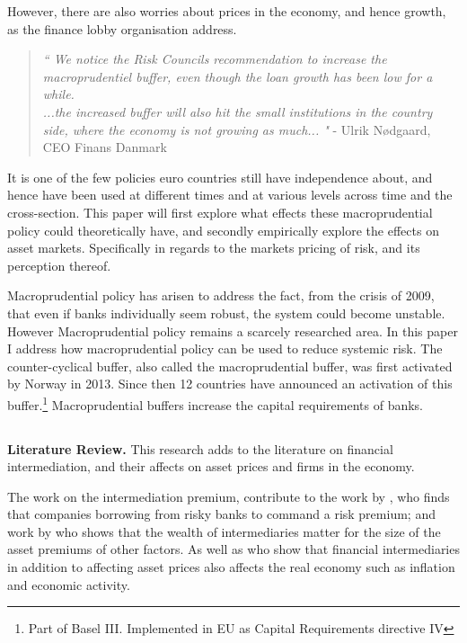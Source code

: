 \documentclass[11pt]{article}
\begin{document}
However, there are also worries about prices in the economy, and hence growth, as the finance lobby organisation address.

\begin{quote}\textit{``
We notice the Risk Councils recommendation to increase the macroprudentiel buffer, even though the loan growth has been low for a while.\\ ...the increased buffer will also hit the small institutions in the country side, where the economy is not growing as much...
"}
- {Ulrik Nødgaard, CEO Finans Danmark}
\end{quote}



It is one of the few policies euro countries still have independence about, and hence have been used at different times and at various levels across time and the cross-section. This paper will first explore what effects these macroprudential policy could theoretically have, and secondly empirically explore the effects on asset markets. Specifically in regards to the markets pricing of risk, and its perception thereof.

Macroprudential policy has arisen to address the fact, from the crisis of 2009, that even if banks individually seem robust, the system could become unstable.
However Macroprudential policy remains a scarcely researched area. In this paper I address how macroprudential policy can be used to reduce systemic risk. The counter-cyclical buffer, also called the macroprudential buffer, was first activated by Norway in 2013. Since then 12 countries have announced an activation of this buffer.\footnote{Part of Basel III. Implemented in EU as Capital Requirements directive IV} Macroprudential buffers increase the capital requirements of banks.


\subsection*{}
\vspace{-1.5cm}
\textbf{Literature Review.} 
This research adds to the literature on financial intermediation, and their affects on asset prices and firms in the economy.

The work on the intermediation premium, contribute to the work by \citet{Marchuk2017}, who finds that companies borrowing from risky banks to command a risk premium; and work by \citet{Adrian2014} who shows that the wealth of intermediaries matter for the size of the asset premiums of other factors. As well as \citet{Adrian2010} who show that financial intermediaries in addition to affecting asset prices also affects the real economy such as inflation and economic activity.
\end{document}
